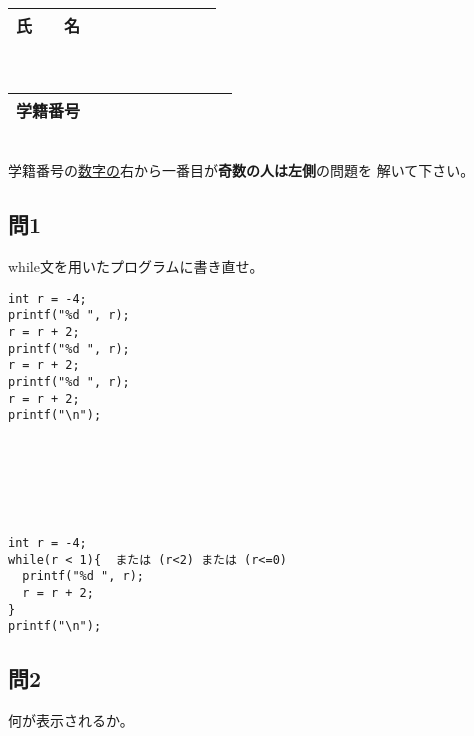 \documentclass[a4j]{jarticle}
\def\ds{\displaystyle}
\begin{document}
\thispagestyle{empty}

\begin{multicols*}{2}%


\def\subst#1#2{$\ds #1$
 \ $\longrightarrow$\ 
 \underline{\hbox to 5cm{\ttfamily #2}}}



\noindent
\begin{tabular}[t]{|c|cccccccc|}\hline
氏　　名 & & & & & & & & \\ \hline
\end{tabular}\\
\begin{tabular}[t]{|c|c|c|c|c|c|c|c|c|c|}\hline
学籍番号 & & & & & & & & \\ \hline
\end{tabular}\\
学籍番号の\underline{数字の}右から一番目が{\bfseries 奇数の人は左側}の問題を
解いて下さい。
\vspace{-5ex}






\subsection*{問1}

{\ttfamily while}文を用いたプログラムに書き直せ。
\begin{verbatim}
int r = -4;
printf("%d ", r);
r = r + 2;
printf("%d ", r);
r = r + 2;
printf("%d ", r);
r = r + 2;
printf("\n");
\end{verbatim}

\ifnum {}
\begin{verbatim}






\end{verbatim}
\else
\begin{verbatim}
int r = -4;
while(r < 1){  または (r<2) または (r<=0)
  printf("%d ", r);
  r = r + 2;
}
printf("\n");
\end{verbatim}
\fi

\vspace*{7cm}




\subsection*{問2}

何が表示されるか。


\end{multicols*}
\end{document}

